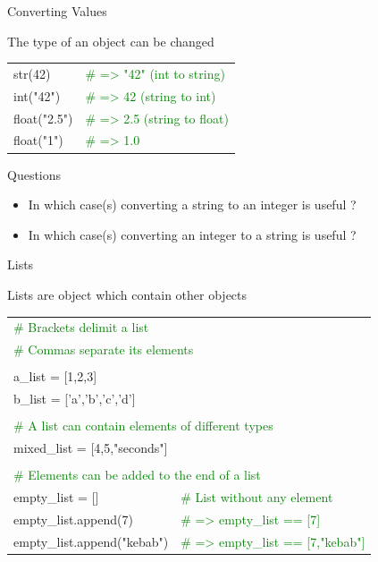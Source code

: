 \documentclass[serif, aspectratio=169]{beamer}
\newcommand{\tgreen}[1]{\textcolor{green}{#1}}
\newenvironment{CLI} %
    {
    \noindent
    \ttfamily 
    \footnotesize
    \begin{tcolorbox}[colback=gray!150,colframe=black]
    \color{white}
    \begin{tabular}{p{4.5cm}p{7.5cm}}
    }
    { 
    \end{tabular}
    \end{tcolorbox}
    }
\begin{document}
\begin{frame}{Converting Values}
    \begin{block}{The type of an object can be changed}
        \vspace{2pt}
        \begin{CLI}
            str(42) & \tgreen{\# => "42" (int to string)} \\
            int("42") & \tgreen{\# => 42 (string to int)} \\
            float("2.5") & \tgreen{\# => 2.5 (string to float)} \\
            float("1") & \tgreen{\# => 1.0} \\
        \end{CLI}
    \end{block}
    \pause
    \begin{block}{Questions}
        \begin{itemize}
            \item In which case(s) converting a string to an integer is useful ? %
            \item In which case(s) converting an integer to a string is useful ? %
        \end{itemize}
    \end{block}
\end{frame}

\begin{frame}{Lists}
     \begin{block}{Lists are object which contain other objects}
        \vspace{2pt}
        \begin{CLI}
            \tgreen{\# Brackets delimit a list} & \\
            \multicolumn{2}{l}{\tgreen{\# Commas separate its elements}} \\
            & \\
            a\_list = [1,2,3] & \\
            b\_list = ['a','b','c','d'] & \\
            \pause
            & \\
            \multicolumn{2}{l}{\tgreen{\# A list can contain elements of different types}} \\
            \multicolumn{2}{l}{mixed\_list = [4,5,"seconds"]} \\
            \pause
            & \\
            \multicolumn{2}{l}{\tgreen{\# Elements can be added to the end of a list}} \\
            empty\_list = [] & \tgreen{\# List without any element} \\
            empty\_list.append(7) & \tgreen{\# => empty\_list == [7]} \\
            empty\_list.append("kebab") & \tgreen{\# => empty\_list == [7,"kebab"]} \\
        \end{CLI}
     \end{block}
\end{frame}
\end{document}
